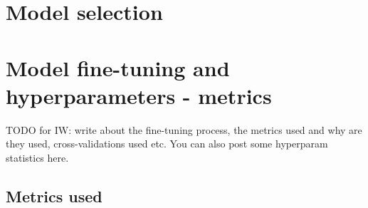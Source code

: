 

\section{Model selection}



\section{Model fine-tuning and hyperparameters - metrics}

TODO for IW: write about the fine-tuning process, the metrics used and why are they used, cross-validations used etc. You can also post some hyperparam statistics here.

\subsection{Metrics used}
